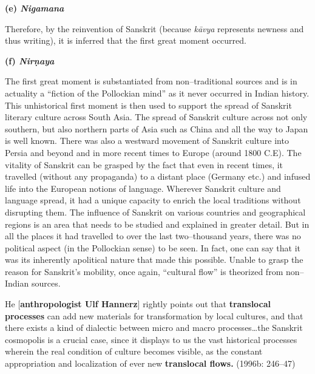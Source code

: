 \textbf{(e) \textit{Nigamana}}

Therefore, by the reinvention of Sanskrit (because \textit{kāvya} represents newness and thus writing), it is inferred that the first great moment occurred.

\textbf{(f) \textit{Nirṇaya}}

The first great moment is substantiated from non–traditional sources and is in actuality a “fiction of the Pollockian mind” as it never occurred in Indian history. This unhistorical first moment is then used to support the spread of Sanskrit literary culture across South Asia. The spread of Sanskrit culture across not only southern, but also northern parts of Asia such as China and all the way to Japan is well known. There was also a westward movement of Sanskrit culture into Persia and beyond and in more recent times to Europe (around 1800 C.E). The vitality of Sanskrit can be grasped by the fact that even in recent times, it travelled (without any propaganda) to a distant place (Germany etc.) and infused life into the European notions of language. Wherever Sanskrit culture and language spread, it had a unique capacity to enrich the local traditions without disrupting them. The influence of Sanskrit on various countries and geographical regions is an area that needs to be studied and explained in greater detail. But in all the places it had travelled to over the last two–thousand years, there was no political aspect (in the Pollockian sense) to be seen. In fact, one can say that it was its inherently apolitical nature that made this possible. Unable to grasp the reason for Sanskrit’s mobility, once again, “cultural flow” is theorized from non–Indian sources.

\begin{myquote}
He [\textbf{anthropologist Ulf Hannerz}] rightly points out that \textbf{translocal processes} can add new materials for transformation by local cultures, and that there exists a kind of dialectic between micro and macro processes…the Sanskrit cosmopolis is a crucial case, since it displays to us the vast historical processes wherein the real condition of culture becomes visible, as the constant appropriation and localization of ever new \textbf{translocal flows.} (1996b: 246–47)
\end{myquote}

\newpage

